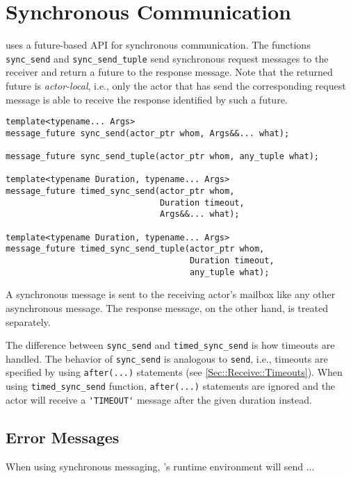 \section{Synchronous Communication}
\label{Sec::Sync}

\libcppa uses a future-based API for synchronous communication.
The functions \lstinline^sync_send^ and \lstinline^sync_send_tuple^ send synchronous request messages to the receiver and return a future to the response message.
Note that the returned future is \textit{actor-local}, i.e., only the actor that has send the corresponding request message is able to receive the response identified by such a future.

\begin{lstlisting}
template<typename... Args>
message_future sync_send(actor_ptr whom, Args&&... what);

message_future sync_send_tuple(actor_ptr whom, any_tuple what);

template<typename Duration, typename... Args>
message_future timed_sync_send(actor_ptr whom,
                               Duration timeout,
                               Args&&... what);

template<typename Duration, typename... Args>
message_future timed_sync_send_tuple(actor_ptr whom,
                                     Duration timeout,
                                     any_tuple what);
\end{lstlisting}

A synchronous message is sent to the receiving actor's mailbox like any other asynchronous message.
The response message, on the other hand, is treated separately.

The difference between \lstinline^sync_send^ and \lstinline^timed_sync_send^ is how timeouts are handled.
The behavior of \lstinline^sync_send^ is analogous to \lstinline^send^, i.e., timeouts are specified by using \lstinline^after(...)^ statements (see \ref{Sec::Receive::Timeouts}).
When using \lstinline^timed_sync_send^ function, \lstinline^after(...)^ statements are ignored and the actor will receive a \lstinline^'TIMEOUT'^ message after the given duration instead.

\subsection{Error Messages}

When using synchronous messaging, \libcppa's runtime environment will send ...

